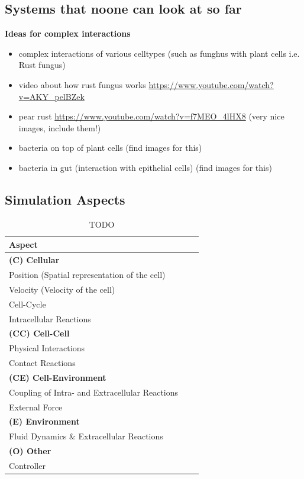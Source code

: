 \subsection{Systems that noone can look at so far}

\textbf{Ideas for complex interactions}
\begin{itemize}
    \item complex interactions of various celltypes (such as funghus with plant cells i.e. Rust
        fungus)
    \item video about how rust fungus works \url{https://www.youtube.com/watch?v=AKY_pelBZek}
    \item pear rust \url{https://www.youtube.com/watch?v=f7MEO_4lHX8} (very nice images, include
        them!)
    \item bacteria on top of plant cells (find images for this)
    \item bacteria in gut (interaction with epithelial cells) (find images for this)
\end{itemize}

\subsection{Simulation Aspects}
\begin{table}[H]
    \centering
    \begin{tabular}{lll}
        Aspect\\
        \toprule
        \textbf{(C) Cellular}\\
        \midrule
        Position    (Spatial representation of the cell)\\
        Velocity    (Velocity of the cell)\\
        Cell-Cycle\\
        Intracellular Reactions   &\\
        \midrule
        \textbf{(CC) Cell-Cell}\\
        Physical Interactions\\
        Contact Reactions\\
        \midrule
        \textbf{(CE) Cell-Environment}\\
        \midrule
        Coupling of Intra- and Extracellular Reactions\\
        External Force\\
        \textbf{(E) Environment}\\
        \midrule
        Fluid Dynamics \& Extracellular Reactions\\
        \textbf{(O) Other}\\
        \midrule
        Controller\\
        \bottomrule
    \end{tabular}
    \caption{TODO}
\end{table}

